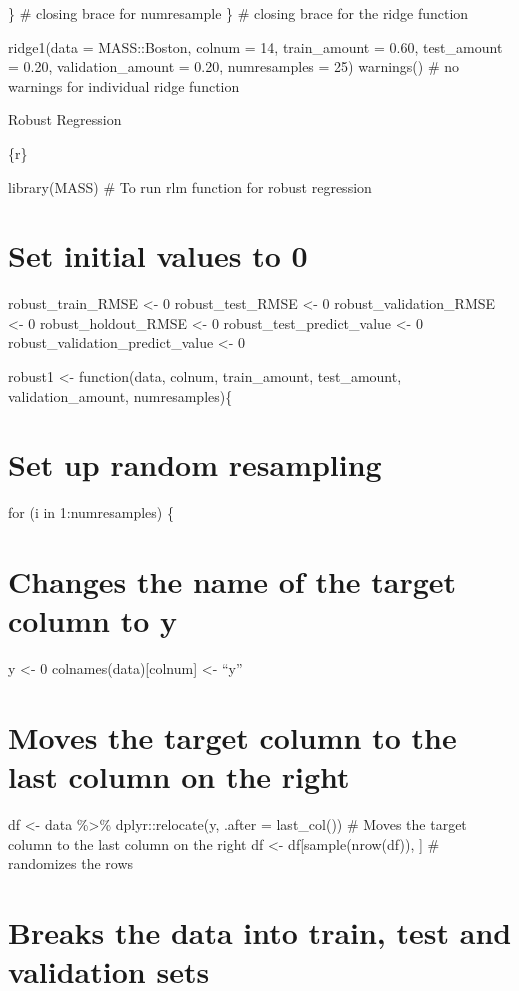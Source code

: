 \documentclass[
]{book}
\begin{document}
\} \# closing brace for numresample \} \# closing brace for the ridge
function

ridge1(data = MASS::Boston, colnum = 14, train\_amount = 0.60,
test\_amount = 0.20, validation\_amount = 0.20, numresamples = 25)
warnings() \# no warnings for individual ridge function

Robust Regression

\{r\}

library(MASS) \# To run rlm function for robust regression

\chapter{Set initial values to 0}\label{set-initial-values-to-0-16}

robust\_train\_RMSE \textless- 0 robust\_test\_RMSE \textless- 0 robust\_validation\_RMSE
\textless- 0 robust\_holdout\_RMSE \textless- 0 robust\_test\_predict\_value \textless- 0
robust\_validation\_predict\_value \textless- 0

robust1 \textless- function(data, colnum, train\_amount, test\_amount,
validation\_amount, numresamples)\{

\chapter{Set up random resampling}\label{set-up-random-resampling-13}

for (i in 1:numresamples) \{

\chapter{Changes the name of the target column to y}\label{changes-the-name-of-the-target-column-to-y-13}

y \textless- 0 colnames(data){[}colnum{]} \textless- ``y''

\chapter{Moves the target column to the last column on the right}\label{moves-the-target-column-to-the-last-column-on-the-right-13}

df \textless- data \%\textgreater\% dplyr::relocate(y, .after = last\_col()) \# Moves the
target column to the last column on the right df \textless-
df{[}sample(nrow(df)), {]} \# randomizes the rows

\chapter{Breaks the data into train, test and validation sets}\label{breaks-the-data-into-train-test-and-validation-sets-13}
\end{document}
